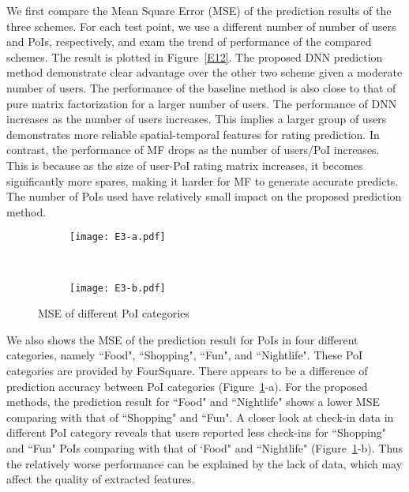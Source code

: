 We first compare the Mean Square Error (MSE) of the prediction results of the three schemes. For each test point, we use a different number of number of users and PoIs, respectively, and exam the trend of performance of the compared schemes. The result is plotted in Figure~\ref{E12}. The proposed DNN prediction method demonstrate clear advantage over the other two scheme given a moderate number of users. The performance of the baseline method is also close to that of pure matrix factorization for a larger number of users. The performance of DNN increases as the number of users increases. This implies a larger group of users demonstrates more reliable spatial-temporal features for rating prediction. In contrast, the performance of MF drops as the number of users/PoI increases. This is because as the size of user-PoI rating matrix increases, it becomes significantly more spares, making it harder for MF to generate accurate predicts. The number of PoIs used have relatively small impact on the proposed prediction method.

\begin{figure}[htbp]%
        \centering
        \begin{subfigure}{0.25\textwidth}
               \texttt{[image: E3-a.pdf]}
        \end{subfigure}%
        ~ %
        \begin{subfigure}{0.25\textwidth}
                \texttt{[image: E3-b.pdf]}
        \end{subfigure}
         \caption{MSE of different PoI categories}\label{E3}
         \vspace{-2mm}
\end{figure}


We also shows the MSE of the prediction result for PoIs in four different categories, namely ``Food", ``Shopping", ``Fun", and ``Nightlife". These PoI categories are provided by FourSquare. There appears to be a difference of prediction accuracy between PoI categories (Figure~\ref{E3}-a). For the proposed methods, the prediction result for ``Food" and ``Nightlife" shows a lower MSE comparing with that of ``Shopping" and ``Fun". A closer look at check-in data in different PoI category reveals that users reported less check-ins for ``Shopping" and ``Fun" PoIs comparing with that of `Food" and ``Nightlife" (Figure~\ref{E3}-b). Thus the relatively worse performance can be explained by the lack of data, which may affect the quality of extracted features.

